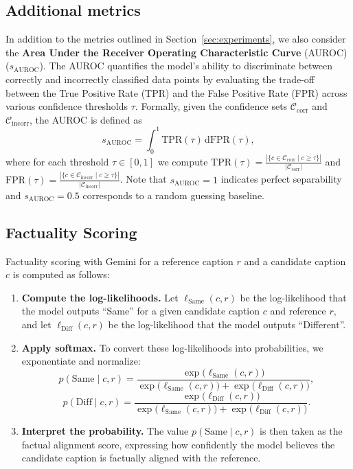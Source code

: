 \subsection{Additional metrics}
\label{app:add_metrics}

In addition to the metrics outlined in Section~\ref{sec:experiments}, we also consider the \textbf{Area Under the Receiver Operating Characteristic Curve} (AUROC) ($s_\text{AUROC}$). The AUROC quantifies the model's ability to discriminate between correctly and incorrectly classified data points by evaluating the trade-off between the True Positive Rate (TPR) and the False Positive Rate (FPR) across various confidence thresholds $\tau$. Formally, given the confidence sets $\mathcal{C}_\text{corr}$ and $\mathcal{C}_\text{incorr}$, the AUROC is defined as
    \begin{equation}
        s_\text{AUROC} = \int_{0}^{1} \text{TPR}(\tau) \, \mathrm{d}\text{FPR}(\tau),
    \end{equation}
    where for each threshold $\tau \in [0,1]$ we compute $\text{TPR}(\tau) = \frac{|\{c \in \mathcal{C}_\text{corr} \mid c \geq \tau\}|}{|\mathcal{C}_\text{corr}|}$ and $\text{FPR}(\tau) = \frac{|\{c \in \mathcal{C}_\text{incorr} \mid c \geq \tau\}|}{|\mathcal{C}_\text{incorr}|}$. Note that $s_\text{AUROC} = 1$ indicates perfect separability and  $s_\text{AUROC} = 0.5$ corresponds to a random guessing baseline.

\subsection{Factuality Scoring}
\label{app:fac_scoring}

Factuality scoring with Gemini for a reference caption $r$ and a candidate caption $c$ is computed as follows:
\begin{enumerate}
    \item \textbf{Compute the log-likelihoods.} Let $\ell_{\text{Same}}(c, r)$ be the log-likelihood that the model outputs ``Same'' for a given candidate caption $c$ and reference $r$, and let $\ell_{\text{Diff}}(c, r)$ be the log-likelihood that the model outputs ``Different''.

    \item \textbf{Apply softmax.} To convert these log-likelihoods into probabilities, we exponentiate and normalize:
    \[
        p(\text{Same} \mid c, r) = \frac{\exp\bigl(\ell_{\text{Same}}(c, r)\bigr)}
        {\exp\bigl(\ell_{\text{Same}}(c, r)\bigr) + \exp\bigl(\ell_{\text{Diff}}(c, r)\bigr)},
    \]
    \[
        p(\text{Diff} \mid c, r) = \frac{\exp\bigl(\ell_{\text{Diff}}(c, r)\bigr)}
        {\exp\bigl(\ell_{\text{Same}}(c, r)\bigr) + \exp\bigl(\ell_{\text{Diff}}(c, r)\bigr)}.
    \]

    \item \textbf{Interpret the probability.} The value $p(\text{Same} \mid c, r)$ is then taken as the factual alignment score, expressing how confidently the model believes the candidate caption is factually aligned with the reference.
\end{enumerate}

